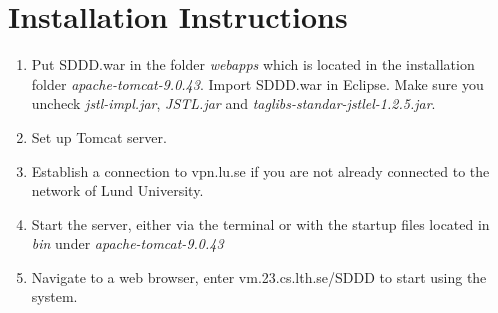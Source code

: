 \documentclass{article}
\begin{document}
   





\section{Installation Instructions}

\begin{enumerate}
    \item Put SDDD.war in the folder \textit{webapps} which is located in the installation folder \textit{apache-tomcat-9.0.43}. Import SDDD.war in Eclipse. Make sure you uncheck \textit{jstl-impl.jar}, \textit{JSTL.jar} and \textit{taglibs-standar-jstlel-1.2.5.jar}.
    \item Set up Tomcat server.
    \item Establish a connection to vpn.lu.se if you are not already connected to the network of Lund University.
    \item Start the server, either via the terminal or with the startup files located in \textit{bin} under \textit{apache-tomcat-9.0.43} 
    \item Navigate to a web browser, enter vm.23.cs.lth.se/SDDD to start using the system.
\end{enumerate}



\end{document}
